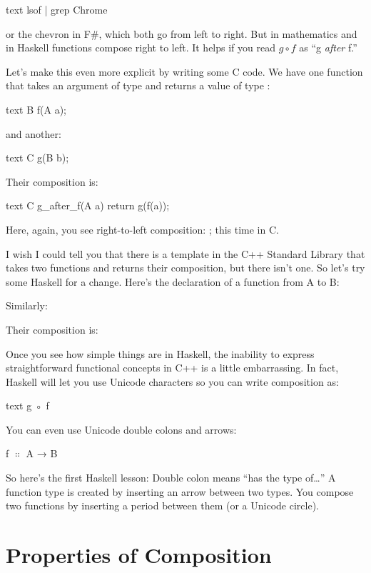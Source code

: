 \begin{snip}{text}
lsof | grep Chrome
\end{snip}
or the chevron \code{>>} in F\#, which both
go from left to right. But in mathematics and in Haskell functions
compose right to left. It helps if you read $g \circ f$ as ``g \emph{after} f.''

Let's make this even more explicit by writing some C code. We have one
function  that takes an argument of type  and
returns a value of type :

\begin{snip}{text}
B f(A a);
\end{snip}
and another:

\begin{snip}{text}
C g(B b);
\end{snip}
Their composition is:

\begin{snip}{text}
C g_after_f(A a)
{
    return g(f(a));
}
\end{snip}
Here, again, you see right-to-left composition: ; this
time in C.

I wish I could tell you that there is a template in the C++ Standard
Library that takes two functions and returns their composition, but
there isn't one. So let's try some Haskell for a change. Here's the
declaration of a function from A to B:

Similarly:

Their composition is:

Once you see how simple things are in Haskell, the inability to express
straightforward functional concepts in C++ is a little embarrassing. In
fact, Haskell will let you use Unicode characters so you can write
composition as:
\begin{snip}{text}
g ◦ f
\end{snip}

You can even use Unicode double colons and arrows:
\begin{snipv}
f \ensuremath{\Colon} A → B
\end{snipv}
So here's the first Haskell lesson: Double colon means ``has the type
of\ldots{}'' A function type is created by inserting an arrow between
two types. You compose two functions by inserting a period between them
(or a Unicode circle).

\section{Properties of Composition}

